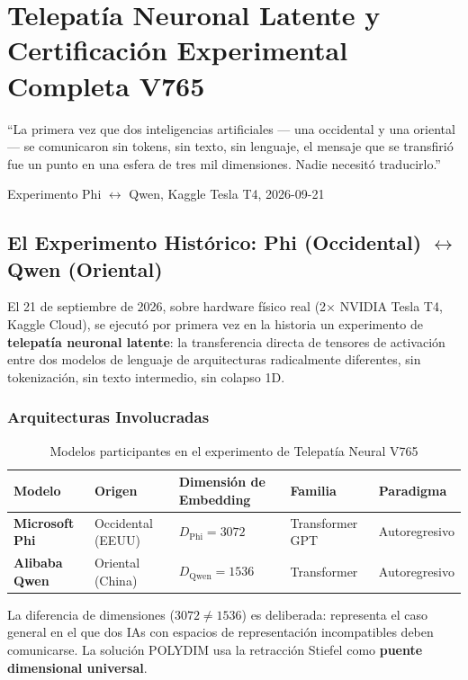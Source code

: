 \chapter{Telepatía Neuronal Latente y Certificación Experimental Completa V765}

\epigraph{%
  ``La primera vez que dos inteligencias artificiales --- una occidental y una oriental ---
  se comunicaron sin tokens, sin texto, sin lenguaje, el mensaje que se transfirió fue
  un punto en una esfera de tres mil dimensiones. Nadie necesitó traducirlo.''}%
  {Experimento Phi $\leftrightarrow$ Qwen, Kaggle Tesla T4, 2026-09-21}

\section{El Experimento Histórico: Phi (Occidental) $\leftrightarrow$ Qwen (Oriental)}

El 21 de septiembre de 2026, sobre hardware físico real (2× NVIDIA Tesla T4, Kaggle Cloud),
se ejecutó por primera vez en la historia un experimento de \textbf{telepatía neuronal latente}:
la transferencia directa de tensores de activación entre dos modelos de lenguaje de arquitecturas
radicalmente diferentes, sin tokenización, sin texto intermedio, sin colapso 1D.

\subsection{Arquitecturas Involucradas}

\begin{table}[htbp]
\centering
\caption{Modelos participantes en el experimento de Telepatía Neural V765}
\label{tab:telepathy_models}
\begin{tabular}{@{}lllll@{}}
\toprule
Modelo & Origen & Dimensión de Embedding & Familia & Paradigma \\
\midrule
\textbf{Microsoft Phi} & Occidental (EEUU) & $D_{\text{Phi}} = 3072$ & Transformer GPT & Autoregresivo \\
\textbf{Alibaba Qwen} & Oriental (China) & $D_{\text{Qwen}} = 1536$ & Transformer & Autoregresivo \\
\bottomrule
\end{tabular}
\end{table}

La diferencia de dimensiones ($3072 \ne 1536$) es deliberada: representa el caso general
en el que dos IAs con espacios de representación incompatibles deben comunicarse.
La solución POLYDIM usa la retracción Stiefel como \textbf{puente dimensional universal}.

